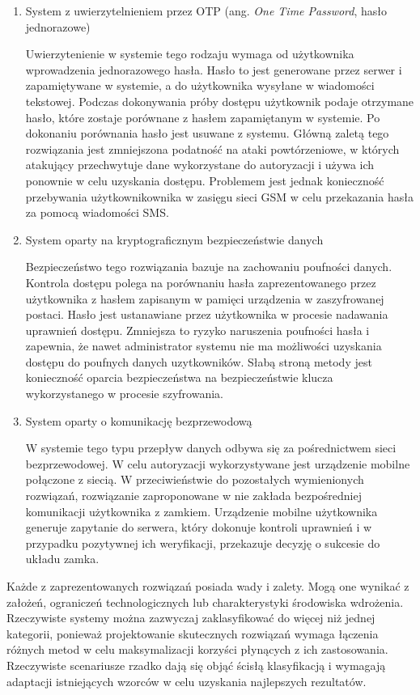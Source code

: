 \begin{enumerate}[label=\Alph*.]
			\item System z uwierzytelnieniem przez OTP (ang. \textit{One Time Password}, hasło jednorazowe)

				Uwierzytenienie w systemie tego rodzaju wymaga od użytkownika wprowadzenia jednorazowego hasła. Hasło to jest generowane przez serwer i zapamiętywane w systemie, a do użytkownika wysyłane w wiadomości tekstowej. Podczas dokonywania próby dostępu użytkownik podaje otrzymane hasło, które zostaje porównane z hasłem zapamiętanym w systemie. Po dokonaniu porównania hasło jest usuwane z systemu. Główną zaletą tego rozwiązania jest zmniejszona podatność na ataki powtórzeniowe, w których atakujący przechwytuje dane wykorzystane do autoryzacji i używa ich ponownie w celu uzyskania dostępu. Problemem jest jednak konieczność przebywania użytkownikownika w zasięgu sieci GSM w celu przekazania hasła za pomocą wiadomości SMS.

			\item System oparty na kryptograficznym bezpieczeństwie danych

				Bezpieczeństwo tego rozwiązania bazuje na zachowaniu poufności danych. Kontrola dostępu polega na porównaniu hasła zaprezentowanego przez użytkownika z hasłem zapisanym w pamięci urządzenia w zaszyfrowanej postaci. Hasło jest ustanawiane przez użytkownika w procesie nadawania uprawnień dostępu. Zmniejsza to ryzyko naruszenia poufności hasła i zapewnia, że nawet administrator systemu nie ma możliwości uzyskania dostępu do poufnych danych uzytkowników. Słabą stroną metody jest konieczność oparcia bezpieczeństwa na bezpieczeństwie klucza wykorzystanego w procesie szyfrowania.

			\item System oparty o komunikację bezprzewodową

				W systemie tego typu przepływ danych odbywa się za pośrednictwem sieci bezprzewodowej. W celu autoryzacji wykorzystywane jest urządzenie mobilne połączone z siecią. W przeciwieństwie do pozostałych wymienionych rozwiązań, rozwiązanie zaproponowane w \cite{cryptographic-iot-access-system} nie zakłada bezpośredniej komunikacji użytkownika z zamkiem. Urządzenie mobilne użytkownika generuje zapytanie do serwera, który dokonuje kontroli uprawnień i w przypadku pozytywnej ich weryfikacji, przekazuje decyzję o sukcesie do układu zamka.


		\end{enumerate}

		Każde z zaprezentowanych rozwiązań posiada wady i zalety. Mogą one wynikać z założeń, ograniczeń technologicznych lub charakterystyki środowiska wdrożenia. Rzeczywiste systemy można zazwyczaj zaklasyfikować do więcej niż jednej kategorii, ponieważ projektowanie skutecznych rozwiązań wymaga łączenia różnych metod w celu maksymalizacji korzyści płynących z ich zastosowania. Rzeczywiste scenariusze rzadko dają się objąć ścisłą klasyfikacją i wymagają adaptacji istniejących wzorców w celu uzyskania najlepszych rezultatów.

